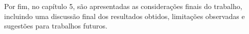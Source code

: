 Por fim, no capítulo 5, são apresentadas as considerações finais do trabalho, incluindo uma discussão final dos resultados
obtidos, limitações observadas e sugestões para trabalhos futuros.



